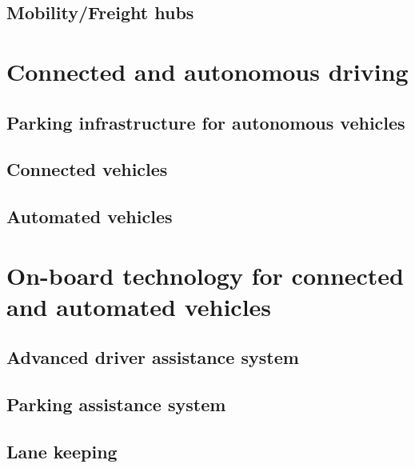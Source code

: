 \documentclass[
]{book}
\begin{document}
\hypertarget{mobilityfreight-hubs}{%
\section{Mobility/Freight hubs}\label{mobilityfreight-hubs}}

\hypertarget{connected}{%
\chapter{Connected and autonomous driving}\label{connected}}

\hypertarget{parking-infrastructure-for-autonomous-vehicles}{%
\section{Parking infrastructure for autonomous vehicles}\label{parking-infrastructure-for-autonomous-vehicles}}

\hypertarget{connected-vehicles}{%
\section{Connected vehicles}\label{connected-vehicles}}

\hypertarget{automated-vehicles}{%
\section{Automated vehicles}\label{automated-vehicles}}

\hypertarget{onboard}{%
\chapter{On-board technology for connected and automated vehicles}\label{onboard}}

\hypertarget{advanced-driver-assistance-system}{%
\section{Advanced driver assistance system}\label{advanced-driver-assistance-system}}

\hypertarget{parking-assistance-system}{%
\section{Parking assistance system}\label{parking-assistance-system}}

\hypertarget{lane-keeping}{%
\section{Lane keeping}\label{lane-keeping}}
\end{document}

